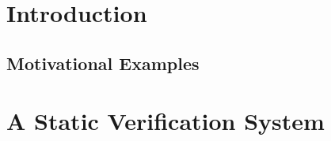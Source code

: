 \section{Introduction}
\label{ch:introduction}


    \subsection{Motivational Examples}
    \label{sec:motivationexamples}
    



%

%

%

%




\section{A Static Verification System}
\label{ch:gradualization-of-a}

\label{ch:case-study--implicit}


%

